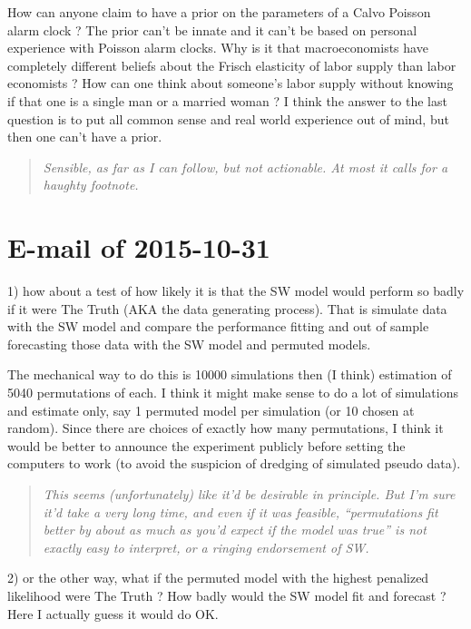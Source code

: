 \documentclass{article}
\begin{document}
How can anyone claim to have a prior on the parameters of a Calvo Poisson alarm clock ?  The prior can't be innate and it can't be based on personal experience with Poisson alarm clocks.  Why is it that macroeconomists have completely different beliefs about the Frisch elasticity of labor supply than labor economists ?  How can one think about someone's labor supply without knowing if that one is a single man or a married woman ? I think the answer to the last question is to put all common sense and real world experience out of mind, but then one can't have a prior.

\begin{quotation} {\em Sensible, as far as I can follow, but not actionable.  At most it calls for a haughty footnote.}
\end{quotation}

\section{E-mail of 2015-10-31}

1) how about a test of how likely it is that the SW model would perform so badly if it were The Truth (AKA the data generating process).  That is simulate data with the SW model and compare the performance fitting and out of sample forecasting those data with the SW model and permuted models.

The mechanical way to do this is 10000 simulations then (I think) estimation of 5040 permutations of each.  I think it might make sense to do a lot of simulations and estimate only, say 1 permuted model per simulation (or 10 chosen at random). Since there are choices of exactly how many permutations, I think it would be better to announce the experiment publicly before setting the computers to work (to avoid the suspicion of dredging of simulated pseudo data).

\begin{quotation} {\em This seems (unfortunately) like it'd be desirable in
    principle.  But I'm sure it'd take a very long time, and even if it was
    feasible, ``permutations fit better by about as much as you'd expect if the
    model was true'' is not exactly easy to interpret, or a ringing endorsement
    of SW.}
\end{quotation}

2) or the other way, what if the permuted model with the highest penalized likelihood were The Truth ?  How badly would the SW model fit and forecast ?  Here I actually guess it would do OK. 
\end{document}
